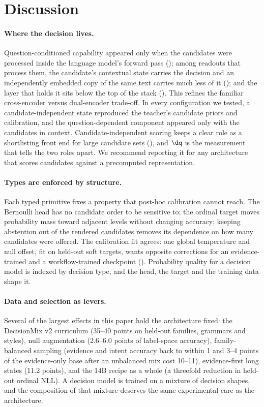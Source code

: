 \section{Discussion}
\label{sec:discussion}

\paragraph{Where the decision lives.} Question-conditioned capability appeared only when the candidates
were processed inside the language model's forward pass (); among readouts
that process them, the candidate's contextual state carries the decision and an independently embedded
copy of the same text carries much less of it (); and the layer that holds it
sits below the top of the stack (). This refines the familiar cross-encoder
versus dual-encoder trade-off. In every configuration we tested, a candidate-independent state
reproduced the teacher's candidate priors and calibration, and the question-dependent component
appeared only with the candidates in context. Candidate-independent scoring keeps a clear role as a
shortlisting front end for large candidate sets (), and $\dq$ is the measurement
that tells the two roles apart. We recommend reporting it for any architecture that scores candidates
against a precomputed representation.

\paragraph{Types are enforced by structure.} Each typed primitive fixes a property that post-hoc
calibration cannot reach. The Bernoulli head has no candidate order to be sensitive to; the ordinal
target moves probability mass toward adjacent levels without changing accuracy; keeping abstention out
of the rendered candidates removes its dependence on how many candidates were offered. The calibration fit
agrees: one global temperature and null offset, fit on
held-out soft targets, wants opposite corrections for an evidence-trained and a workflow-trained
checkpoint (). Probability quality for a decision model is indexed by
decision type, and the head, the target and the training data shape it.

\paragraph{Data and selection as levers.} Several of the largest effects in this paper hold the
architecture fixed: the DecisionMix v2 curriculum (35--40 points on held-out families, grammars and
styles), null augmentation (2.6--6.0 points of label-space accuracy), family-balanced sampling (evidence
and intent accuracy back to within 1 and 3--4 points of the evidence-only base after an unbalanced mix
cost 10--11), evidence-first long states (11.2 points), and the 14B recipe as a whole (a threefold
reduction in held-out ordinal NLL). A decision model is trained on a mixture of decision shapes, and the
composition of that mixture deserves the same experimental care as the architecture.

